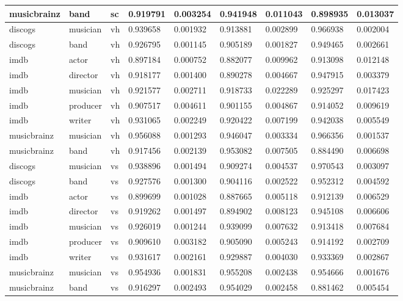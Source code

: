 \documentclass[epsfig,a4paper,11pt,titlepage,twoside,openany]{book}
\begin{document}
\begin{longtable}{|l|l|l|l|l|l|l|l|l|}
musicbrainz & band     & sc    & 0.919791 & 0.003254 & 0.941948  & 0.011043 & 0.898935 & 0.013037 \\ \hline
discogs     & musician & vh    & 0.939658 & 0.001932 & 0.913881  & 0.002899 & 0.966938 & 0.002004 \\
discogs     & band     & vh    & 0.926795 & 0.001145 & 0.905189  & 0.001827 & 0.949465 & 0.002661 \\
imdb        & actor    & vh    & 0.897184 & 0.000752 & 0.882077  & 0.009962 & 0.913098 & 0.012148 \\
imdb        & director & vh    & 0.918177 & 0.001400 & 0.890278  & 0.004667 & 0.947915 & 0.003379 \\
imdb        & musician & vh    & 0.921577 & 0.002711 & 0.918733  & 0.022289 & 0.925297 & 0.017423 \\
imdb        & producer & vh    & 0.907517 & 0.004611 & 0.901155  & 0.004867 & 0.914052 & 0.009619 \\
imdb        & writer   & vh    & 0.931065 & 0.002249 & 0.920422  & 0.007199 & 0.942038 & 0.005549 \\
musicbrainz & musician & vh    & 0.956088 & 0.001293 & 0.946047  & 0.003334 & 0.966356 & 0.001537 \\
musicbrainz & band     & vh    & 0.917456 & 0.002139 & 0.953082  & 0.007505 & 0.884490 & 0.006698 \\ \hline
discogs     & musician & vs    & 0.938896 & 0.001494 & 0.909274  & 0.004537 & 0.970543 & 0.003097 \\
discogs     & band     & vs    & 0.927576 & 0.001300 & 0.904116  & 0.002522 & 0.952312 & 0.004592 \\
imdb        & actor    & vs    & 0.899699 & 0.001028 & 0.887665  & 0.005118 & 0.912139 & 0.006529 \\
imdb        & director & vs    & 0.919262 & 0.001497 & 0.894902  & 0.008123 & 0.945108 & 0.006606 \\
imdb        & musician & vs    & 0.926019 & 0.001244 & 0.939099  & 0.007632 & 0.913418 & 0.007684 \\
imdb        & producer & vs    & 0.909610 & 0.003182 & 0.905090  & 0.005243 & 0.914192 & 0.002709 \\
imdb        & writer   & vs    & 0.931617 & 0.002161 & 0.929887  & 0.004030 & 0.933369 & 0.002867 \\
musicbrainz & musician & vs    & 0.954936 & 0.001831 & 0.955208  & 0.002438 & 0.954666 & 0.001676 \\
musicbrainz & band     & vs    & 0.916297 & 0.002493 & 0.954029  & 0.002458 & 0.881462 & 0.005454 \\ \hline
\end{longtable}
\end{document}
